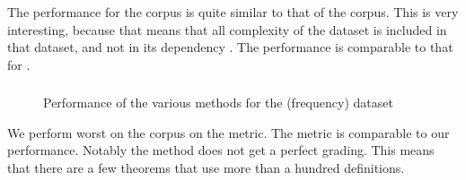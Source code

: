 The \oocover performance for the \mathclasses corpus is quite similar to that of the \coq corpus.
This is very interesting, because that means that all complexity of the \corn dataset is included in that dataset, and not in its dependency \mathclasses.
The \auc performance is comparable to that for \corn.

\subsubsection{\mathcomp}
\begin{figure}[H]
  \centering
  \caption{Performance of the various methods for the \mathcomp (frequency) dataset}
\end{figure}

We perform worst on the \mathcomp corpus on the \oocover metric.
The \auc metric is comparable to our \coq performance.
Notably the \omniscient method does not get a perfect \oocover grading.
This means that there are a few theorems that use more than a hundred definitions.